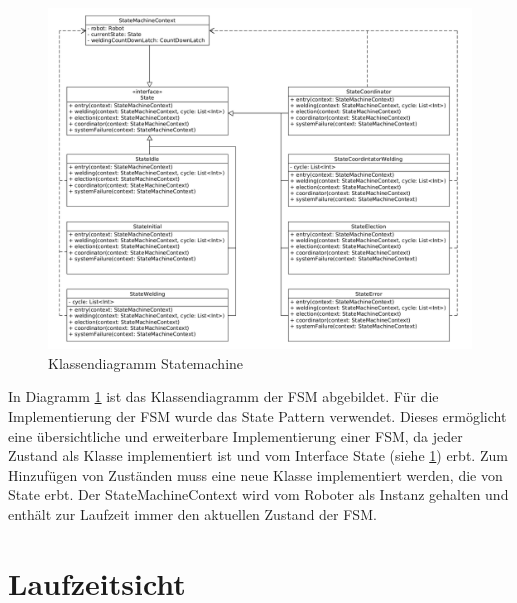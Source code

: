 \begin{figure}[h]
 \includegraphics[width=\textwidth]{../diagrams/5_fsm_klassendiagramm.png}
 \caption{Klassendiagramm Statemachine}
 \label{fig:class_fsm}
\end{figure}

In Diagramm \ref{fig:class_fsm} ist das Klassendiagramm der FSM abgebildet. Für die Implementierung der FSM
wurde das State Pattern \citep{patterns} verwendet. Dieses ermöglicht eine übersichtliche und erweiterbare
Implementierung einer FSM, da jeder Zustand als Klasse implementiert ist und vom Interface \glqq State\grqq{}
(siehe \ref{fig:class_fsm}) erbt. Zum Hinzufügen von Zuständen muss eine neue Klasse implementiert werden, die 
von State erbt. Der StateMachineContext wird vom Roboter als Instanz gehalten und enthält zur Laufzeit immer
den aktuellen Zustand der FSM.


\section{Laufzeitsicht}
